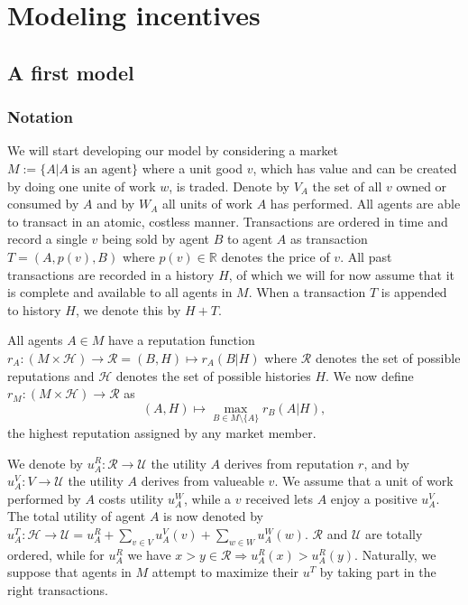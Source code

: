 \chapter{Modeling incentives}
\section{A first model}
\subsection{Notation}
We will start developing our model by considering a market $M := \{ A | A \ \text{is an agent} \}$ where a unit good $v$, which has value and can be created by doing one unite of work $w$, is traded. Denote by $V_A$ the set of all $v$ owned or consumed by $A$ and by $W_A$ all units of work $A$ has performed. All agents are able to transact in an atomic, costless manner. Transactions are ordered in time and record a single $v$ being sold by agent $B$ to agent $A$ as transaction $T = (A, p(v), B)$ where $p(v) \in \mathds{R}$ denotes the price of $v$. All past transactions are recorded in a history $H$, of which we will for now assume that it is complete and available to all agents in $M$. When a transaction $T$ is appended to history $H$, we denote this by $H + T$.

All agents $A \in M$ have a reputation function $r_A: (M \times \mathcal{H}) \to \mathcal{R} = (B, H) \mapsto r_A(B | H)$ where $\mathcal{R}$ denotes the set of possible reputations and $\mathcal{H}$ denotes the set of possible histories $H$. We now define $r_M: (M \times \mathcal{H}) \to \mathcal{R}$ as
\[(A, H) \mapsto \max_{B \in M \setminus \{ A \}} r_B(A | H),\]
the highest reputation assigned by any market member.

We denote by $u^R_A: \mathcal{R} \to \mathcal{U}$ the utility $A$ derives from reputation $r$, and by $u^V_A: V \to \mathcal{U}$ the utility $A$ derives from valueable $v$. We assume that a unit of work performed by $A$ costs utility $u^W_A$, while a $v$ received lets $A$ enjoy a positive $u^V_A$. The total utility of agent $A$ is now denoted by $u^T_A: \mathcal{H} \to \mathcal{U} = u^R_A + \sum_{v \in V} u^V_A(v) + \sum_{w \in W} u^W_A(w)$. $\mathcal{R}$ and $\mathcal{U}$ are totally ordered, while for $u^R_A$ we have $x > y \in \mathcal{R} \Rightarrow u^R_A(x) > u^R_A(y)$. Naturally, we suppose that agents in $M$ attempt to maximize their $u^T$ by taking part in the right transactions.

